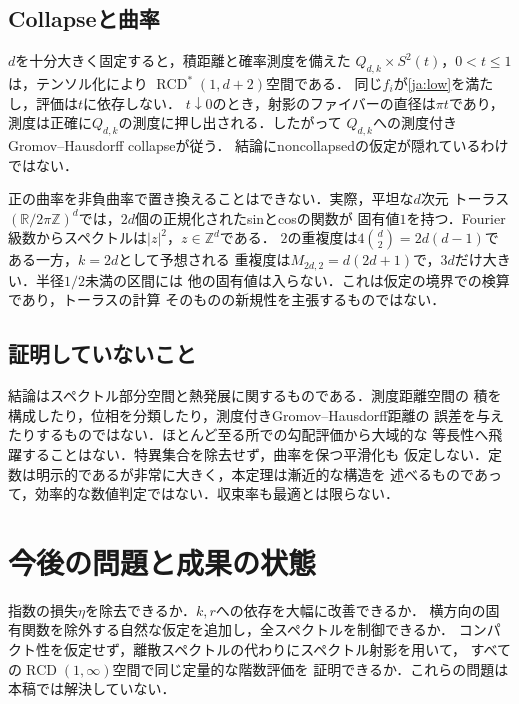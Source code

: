 \documentclass[12pt]{amsart}
\theoremstyle{definition}
\theoremstyle{remark}
\numberwithin{equation}{section}
\newcommand{\R}{\mathbb{R}}
\newcommand{\Z}{\mathbb{Z}}
\newcommand{\RCD}{\operatorname{RCD}^{*}}
\theoremstyle{plain}
\begin{document}
\subsection{Collapseと曲率}
$d$を十分大きく固定すると，積距離と確率測度を備えた
$Q_{d,k}\times S^2(t)$，$0<t\leq1$は，テンソル化により
$\RCD(1,d+2)$空間である\cite[Theorem 3.23]{ja:EKS}．
同じ$f_i$が\eqref{ja:low}を満たし，評価は$t$に依存しない．
$t\downarrow0$のとき，射影のファイバーの直径は$\pi t$であり，
測度は正確に$Q_{d,k}$の測度に押し出される．したがって
$Q_{d,k}$への測度付きGromov--Hausdorff collapseが従う．
結論にnoncollapsedの仮定が隠れているわけではない．

正の曲率を非負曲率で置き換えることはできない．実際，平坦な$d$次元
トーラス$(\R/2\pi\Z)^d$では，$2d$個の正規化されたsinとcosの関数が
固有値$1$を持つ．Fourier級数からスペクトルは$|z|^2$，$z\in\Z^d$である．
$2$の重複度は$4\binom d2=2d(d-1)$である一方，$k=2d$として予想される
重複度は$M_{2d,2}=d(2d+1)$で，$3d$だけ大きい．半径$1/2$未満の区間には
他の固有値は入らない．これは仮定の境界での検算であり，トーラスの計算
そのものの新規性を主張するものではない．

\subsection{証明していないこと}
結論はスペクトル部分空間と熱発展に関するものである．測度距離空間の
積を構成したり，位相を分類したり，測度付きGromov--Hausdorff距離の
誤差を与えたりするものではない．ほとんど至る所での勾配評価から大域的な
等長性へ飛躍することはない．特異集合を除去せず，曲率を保つ平滑化も
仮定しない．定数は明示的であるが非常に大きく，本定理は漸近的な構造を
述べるものであって，効率的な数値判定ではない．収束率も最適とは限らない．

\section{今後の問題と成果の状態}
指数の損失$\eta$を除去できるか．$k,r$への依存を大幅に改善できるか．
横方向の固有関数を除外する自然な仮定を追加し，全スペクトルを制御できるか．
コンパクト性を仮定せず，離散スペクトルの代わりにスペクトル射影を用いて，
すべての$\operatorname{RCD}(1,\infty)$空間で同じ定量的な階数評価を
証明できるか．これらの問題は本稿では解決していない．
\end{document}
